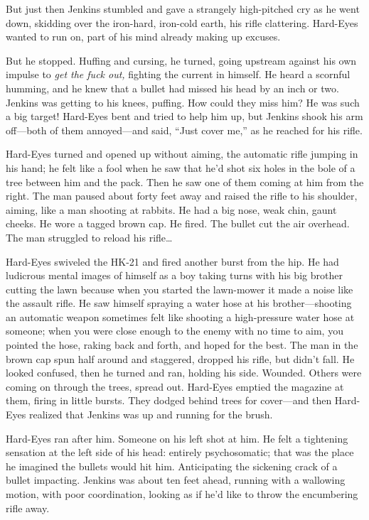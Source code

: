 But just then Jenkins stumbled and gave a strangely high-pitched cry as he went down, skidding over the iron-hard, iron-cold earth, his rifle clattering. Hard-Eyes wanted to run on, part of his mind already making up excuses.

But he stopped. Huffing and cursing, he turned, going upstream against his own impulse to \textit{get the fuck out,} fighting the current in himself. He heard a scornful humming, and he knew that a bullet had missed his head by an inch or two. Jenkins was getting to his knees, puffing. How could they miss him? He was such a big target! Hard-Eyes bent and tried to help him up, but Jenkins shook his arm off---both of them annoyed---and said, ``Just cover me,'' as he reached for his rifle.

Hard-Eyes turned and opened up without aiming, the automatic rifle jumping in his hand; he felt like a fool when he saw that he'd shot six holes in the bole of a tree between him and the pack. Then he saw one of them coming at him from the right. The man paused about forty feet away and raised the rifle to his shoulder, aiming, like a man shooting at rabbits. He had a big nose, weak chin, gaunt cheeks. He wore a tagged brown cap. He fired. The bullet cut the air overhead. The man struggled to reload his rifle\ldots

Hard-Eyes swiveled the HK-21 and fired another burst from the hip. He had ludicrous mental images of himself as a boy taking turns with his big brother cutting the lawn because when you started the lawn-mower it made a noise like the assault rifle. He saw himself spraying a water hose at his brother---shooting an automatic weapon sometimes felt like shooting a high-pressure water hose at someone; when you were close enough to the enemy with no time to aim, you pointed the hose, raking back and forth, and hoped for the best. The man in the brown cap spun half around and staggered, dropped his rifle, but didn't fall. He looked confused, then he turned and ran, holding his side. Wounded. Others were coming on through the trees, spread out. Hard-Eyes emptied the magazine at them, firing in little bursts. They dodged behind trees for cover---and then Hard-Eyes realized that Jenkins was up and running for the brush.

Hard-Eyes ran after him. Someone on his left shot at him. He felt a tightening sensation at the left side of his head: entirely psychosomatic; that was the place he imagined the bullets would hit him. Anticipating the sickening crack of a bullet impacting. Jenkins was about ten feet ahead, running with a wallowing motion, with poor coordination, looking as if he'd like to throw the encumbering rifle away.

